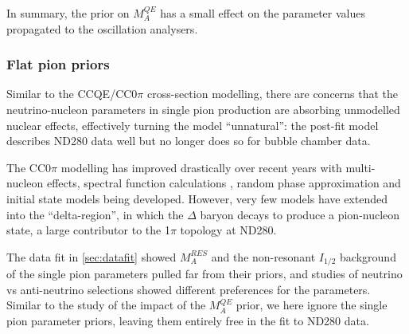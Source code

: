 In summary, the prior on $M_A^{QE}$ has a small effect on the parameter values propagated to the oscillation analysers.

\subsubsection{Flat pion priors}
Similar to the CCQE/CC0$\pi$ cross-section modelling, there are concerns that the neutrino-nucleon parameters in single pion production are absorbing unmodelled nuclear effects, effectively turning the model ``unnatural'': the post-fit model describes ND280 data well but no longer does so for bubble chamber data.

The CC0$\pi$ modelling has improved drastically over recent years with multi-nucleon effects, spectral function calculations , random phase approximation  and initial state models  being developed. However, very few models have extended into the ``delta-region'', in which the $\Delta$ baryon decays to produce a pion-nucleon state, a large contributor to the 1$\pi$ topology at ND280.

The data fit in \autoref{sec:datafit} showed $M_A^{RES}$ and the non-resonant $I_{1/2}$ background of the single pion parameters pulled far from their priors, and studies of neutrino vs anti-neutrino selections showed different preferences for the parameters. Similar to the study of the impact of the $M_A^{QE}$ prior, we here ignore the single pion parameter priors, leaving them entirely free in the fit to ND280 data.

